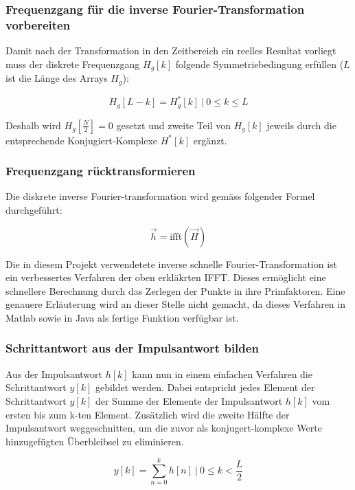 \subsubsection*{Frequenzgang f\"ur die inverse Fourier-Transformation vorbereiten}
Damit nach der Transformation in den Zeitbereich ein reelles Resultat vorliegt
muss der diskrete Frequenzgang $H_g[k]$ folgende Symmetriebedingung erf\"ullen
($L$ ist die L\"ange des Arrays $H_g$):

\begin{equation*}
    H_g[L-k]=H_g^*[k]  ~|~ 0 \leq k \leq L
\end{equation*}

Deshalb  wird $H_g[\frac{N}{2}]  = 0$  gesetzt  und zweite  Teil von  $H_g[k]$
jeweils durch die entsprechende Konjugiert-Komplexe $H^*[k]$ erg\"anzt.

\subsubsection*{Frequenzgang r\"ucktransformieren}
Die  diskrete inverse  Fourier-transformation wird  gem\"ass folgender  Formel
durchgef\"uhrt:

\begin{equation*}
    \vec{h}=\text{ifft}(\vec{H})
\end{equation*}

Die  in diesem  Projekt verwendetete  inverse schnelle  Fourier-Transformation
ist   ein  verbessertes   Verfahren  der   oben  erkl\"akrten   IFFT.   Dieses
erm\"oglicht eine schnellere Berechnung durch  das Zerlegen der Punkte in ihre
Primfaktoren. Eine genauere Erl\"auterung wird an dieser Stelle nicht gemacht,
da dieses Verfahren  in Matlab sowie in Java als  fertige Funktion verf\"ugbar
ist.


\subsubsection*{Schrittantwort aus der Impulsantwort bilden}
Aus  der  Impulsantwort $h[k]$  kann  nun  in  einem einfachen  Verfahren  die
Schrittantwort  $y[k]$ gebildet  werden.  Dabei  entspricht jedes  Element der
Schrittantwort  $y[k]$ der  Summe der  Elemente der  Impulsantwort $h[k]$  vom
ersten  bis zum  k-ten Element.   Zus\"atzlich  wird die  zweite H\"alfte  der
Impulsantwort  weggeschnitten,  um  die  zuvor  als  konjugert-komplexe  Werte
hinzugef\"ugten \"Uberbleibsel zu eliminieren.

\begin{equation*}
    y[k]= \sum_{n=0}^k h[n] ~|~ 0 \leq k < \frac{L}{2}
\end{equation*}
